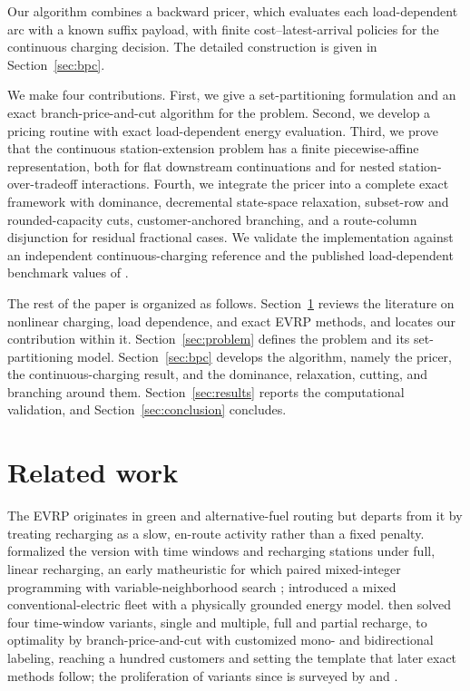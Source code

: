 \documentclass[review,3p,authoryear]{elsarticle}
\theoremstyle{plain}
\theoremstyle{definition}
\theoremstyle{remark}
\begin{document}
Our algorithm combines a backward pricer, which evaluates each load-dependent arc
with a known suffix payload, with finite cost--latest-arrival policies for the
continuous charging decision. The detailed construction is given in
Section~\ref{sec:bpc}.

We make four contributions. First, we give a set-partitioning formulation and an
exact branch-price-and-cut algorithm for the problem. Second, we develop a pricing
routine with exact load-dependent energy evaluation. Third, we
prove that the continuous station-extension problem has a finite piecewise-affine
representation, both for flat downstream continuations and for nested
station-over-tradeoff interactions. Fourth, we integrate the pricer into a complete exact framework with
dominance, decremental state-space relaxation, subset-row and rounded-capacity
cuts, customer-anchored branching, and a route-column disjunction for residual
fractional cases. We validate the implementation against an independent
continuous-charging reference and the
published load-dependent benchmark values of \citet{KancharlaRamadurai2020}.

The rest of the paper is organized as follows. Section~\ref{sec:lit} reviews the
literature on nonlinear charging, load dependence, and exact EVRP methods, and
locates our contribution within it. Section~\ref{sec:problem} defines
the problem and its set-partitioning model. Section~\ref{sec:bpc} develops the
algorithm, namely the pricer, the continuous-charging result, and
the dominance, relaxation, cutting, and branching around them. Section~\ref{sec:results}
reports the computational validation, and Section~\ref{sec:conclusion} concludes.

\section{Related work}
\label{sec:lit}

The EVRP originates in green and alternative-fuel routing but departs from
it by treating recharging as a slow, en-route activity rather than a fixed
penalty. \citet{SchneiderStengerGoeke2014} formalized the version with time windows
and recharging stations under full, linear recharging, an early matheuristic for
which paired mixed-integer programming with variable-neighborhood search
\citep{bruglieri2015variable}; \citet{GoekeSchneider2015}
introduced a mixed conventional-electric fleet with a physically grounded energy
model. \citet{Desaulniers2016} then solved four time-window variants, single and
multiple, full and partial recharge, to optimality by branch-price-and-cut with
customized mono- and bidirectional labeling, reaching a hundred customers and
setting the template that later exact methods follow; the proliferation of variants
since is surveyed by \citet{ErdelicCaric2019} and \citet{kucukoglu2021electric}.
\end{document}

